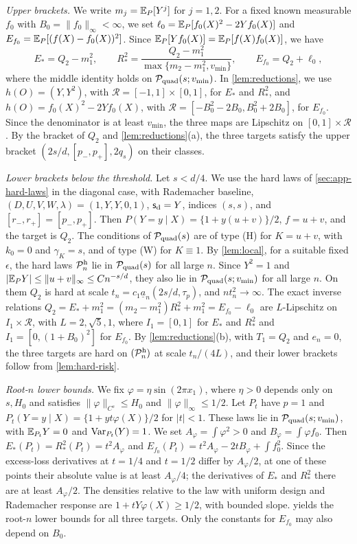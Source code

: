 \emph{Upper brackets.} We write $m_j=\mathbb E_P[Y^j]$ for $j=1,2$. For a fixed
known measurable $f_0$ with $B_0=\|f_0\|_\infty<\infty$, we set
$\ell_0=\mathbb E_P[f_0(X)^2-2Yf_0(X)]$ and $E_{f_0}=\mathbb E_P[(f(X)-f_0(X))^2]$.
Since $\mathbb E_P[Yf_0(X)]=\mathbb E_P[f(X)f_0(X)]$, we have
\[
 E_*=Q_2-m_1^2,\qquad
 R_*^2=\frac{Q_2-m_1^2}{\max\{m_2-m_1^2,v_{\min}\}},\qquad
 E_{f_0}=Q_2+\ell_0,
\]
where the middle identity holds on $\mathcal P_{\rm quad}(s;v_{\min})$. In
\cref{lem:reductions}, we use $h(O)=(Y,Y^2)$, with
$\mathcal R=[-1,1]\times[0,1]$, for $E_*$ and $R_*^2$, and
$h(O)=f_0(X)^2-2Yf_0(X)$, with $\mathcal R=[-B_0^2-2B_0,B_0^2+2B_0]$,
for $E_{f_0}$. Since the denominator is at least $v_{\min}$, the three
maps are Lipschitz on $[0,1]\times\mathcal R$. By the bracket of $Q_2$
and \cref{lem:reductions}(a), the three targets satisfy the upper
bracket $(2s/d,[p_-,p_+],2q_s)$ on their classes.

\emph{Lower brackets below the threshold.} Let $s<d/4$. We use the hard
laws of \cref{sec:app-hard-laws} in the diagonal case, with
Rademacher baseline, $(D,U,V,W,\lambda)=(1,Y,Y,0,1)$,
$\mathsf s_{\rm d}=Y$, indices $(s,s)$, and $[r_-,r_+]=[p_-,p_+]$. Then
$P(Y=y\mid X)=\{1+y(u+v)\}/2$, $f=u+v$, and the target is $Q_2$. The
conditions of $\mathcal P_{\rm quad}(s)$ are of type (H) for $K=u+v$, with
$k_0=0$ and $\gamma_K=s$, and of type (W) for $K\equiv1$. By
\cref{lem:local}, for a suitable fixed $\epsilon$, the hard laws
$\mathcal P^{\rm h}_n$ lie in $\mathcal P_{\rm quad}(s)$ for all large $n$. Since
$Y^2=1$ and $|\mathbb E_PY|\le\|u+v\|_\infty\le Cn^{-s/d}$, they also lie in
$\mathcal P_{\rm quad}(s;v_{\min})$ for all large $n$. On them $Q_2$ is hard at
scale $t_n=c_1\underline a_n(2s/d,\tau_p)$, and $nt_n^2\to\infty$. The
exact inverse relations
$Q_2=E_*+m_1^2=(m_2-m_1^2)R_*^2+m_1^2=E_{f_0}-\ell_0$
are $L$-Lipschitz on $I_1\times\mathcal R$, with $L=2,\sqrt5,1$, where
$I_1=[0,1]$ for $E_*$ and $R_*^2$ and $I_1=[0,(1+B_0)^2]$ for
$E_{f_0}$. By \cref{lem:reductions}(b), with $T_1=Q_2$ and
$e_n=0$, the three targets are hard on $(\mathcal P^{\rm h}_n)$ at scale
$t_n/(4L)$, and their lower brackets follow from
\cref{lem:hard-risk}.

\emph{Root-$n$ lower bounds.} We fix $\varphi=\eta\sin(2\pi x_1)$, where
$\eta>0$ depends only on $s,H_0$ and satisfies
$\|\varphi\|_{C^s}\le H_0$ and $\|\varphi\|_\infty\le1/2$. Let $P_t$
have $p=1$ and $P_t(Y=y\mid X)=\{1+yt\varphi(X)\}/2$ for $|t|<1$.
These laws lie in $\mathcal P_{\rm quad}(s;v_{\min})$, with $\mathbb E_{P_t}Y=0$ and
$\operatorname{Var}_{P_t}(Y)=1$. We set $A_\varphi=\int\varphi^2>0$ and
$B_\varphi=\int\varphi f_0$. Then $E_*(P_t)=R_*^2(P_t)=t^2A_\varphi$
and $E_{f_0}(P_t)=t^2A_\varphi-2tB_\varphi+\int f_0^2$. Since the
excess-loss derivatives at $t=1/4$ and $t=1/2$ differ by $A_\varphi/2$,
at one of these points their absolute value is at least
$A_\varphi/4$; the derivatives of $E_*$ and $R_*^2$ there are at least
$A_\varphi/2$. The densities relative to the law with uniform design
and Rademacher response are $1+tY\varphi(X)\ge1/2$, with bounded slope.
 yields the root-$n$ lower bounds for
all three targets. Only the constants for $E_{f_0}$ may also depend on
$B_0$.

